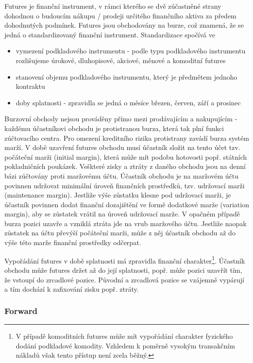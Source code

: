 \documentclass[a4paper]{book}
\begin{document}
Futures je finanční instrument, v rámci kterého se dvě zúčastněné strany dohodnou o budoucím nákupu / prodeji určitého finančního aktiva za předem dohodnutých podmínek. Futures jsou obchodovány na burze, což znamená, že se jedná o standardizovaný finanční instrument. Standardizace spočívá ve
\begin{itemize}
\item vymezení podkladového instrumentu - podle typu podkladového instrumentu rozlišujeme úrokové, dluhopisové, akciové, měnové a komoditní futures
\item stanovení objemu podkladového instrumentu, který je předmětem jednoho kontraktu
\item doby splatnosti - zpravidla se jedná o měsíce březen, červen, září a prosinec
\end{itemize}
Burzovní obchody nejsou prováděny přímo mezi prodávajícím a nakupujícím - každému účastníkovi obchodu je protistranou burza, která tak plní funkci zúčtovacího centra. Pro omezení kreditního rizika protistrany zavádí burza systém marží. V době uzavření futures obchodu musí účastník složit na tento účet tzv. počáteční marži (initial margin), která může mít podobu hotovosti popř. státních pokladničních poukázek. Veškteré zisky a ztráty z daného obchodu jsou na denní bázi zúčtovány proti maržovému účtu. Účastník obchodu je na maržovém účtu povinnen udržovat minimální úroveň finančních prostředků, tzv. udržovací marži (maintenance margin). Jestliže výše zůstatku klesne pod udržovací marži, je účastník povinnen dodat finanční dozajištění ve formě  dodatkové marže (variation margin), aby se zůstatek vrátil na úroveň udržovací marže. V opačném případě burza pozici uzavře a vzniklá ztráta jde na vrub maržového účtu. Jestliže naopak zůstatek na účtu převýší počáteční marži, může z něj účastník obchodu až do výše této marže finanční prostředky odčerpat.

Vypořádání futures v době splatnosti má zpravidla finanční charakter\footnote{V případě komoditních futures může mít vypořádání charakter fyzického dodání podkladové komodity. Vzhledem k poměrně vysokým transakčním nákladů však tento přístup není zcela běžný.}. Účastník obchodu může futures držet až do její splatnosti, popř. může pozici uzavřít tím, že vstoupí do zrcadlové pozice. Původní a zrcadlová pozice se vzájemně vypárují a tím dochází k zafixování zisku popř. ztráty.

\subsubsection{Forward}
\end{document}
